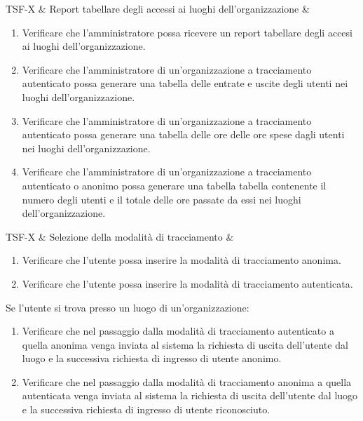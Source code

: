 TSF-X & Report tabellare degli accessi ai luoghi dell'organizzazione  & \begin{enumerate}
\item Verificare che l'amministratore possa ricevere un report tabellare degli accesi ai luoghi dell'organizzazione.
\item Verificare che l'amministratore di un'organizzazione a tracciamento autenticato possa generare una tabella delle entrate e uscite degli utenti nei luoghi dell'organizzazione.
\item Verificare che l'amministratore di un'organizzazione a tracciamento autenticato possa generare una tabella delle ore delle ore spese dagli utenti nei luoghi dell'organizzazione.
\item Verificare che l'amministratore di un'organizzazione a tracciamento autenticato o anonimo possa generare una tabella tabella contenente il numero degli utenti e il totale delle ore passate da essi nei luoghi dell’organizzazione. 
\end{enumerate}


TSF-X & Selezione della modalità di tracciamento & \begin{enumerate}
    \item Verificare che l'utente possa inserire la modalità di tracciamento anonima.
    \item Verificare che l'utente possa inserire la modalità di tracciamento autenticata.
\end{enumerate}
Se l'utente si trova presso un luogo di un'organizzazione:
\begin{enumerate}
    \item Verificare che nel passaggio dalla modalità di tracciamento autenticato a quella anonima venga inviata al sistema la richiesta di uscita dell'utente dal luogo e la successiva richiesta di ingresso di utente anonimo.
    \item Verificare che nel passaggio dalla modalità di tracciamento anonima a quella autenticata venga inviata al sistema la richiesta di uscita dell'utente dal luogo e la successiva richiesta di ingresso di utente riconosciuto.
\end{enumerate} \\

